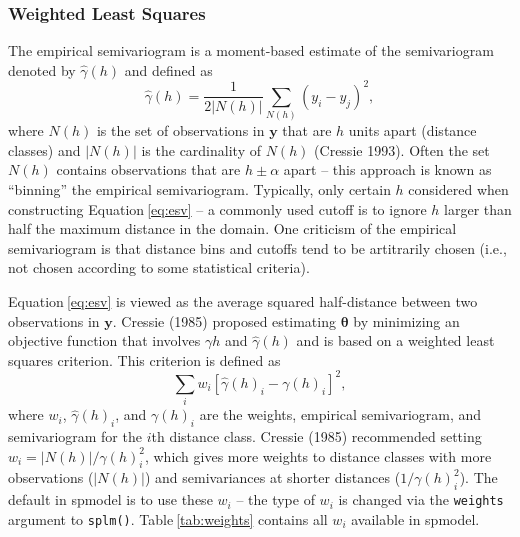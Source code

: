 \documentclass{article}
\begin{document}
\hypertarget{weighted-least-squares}{%
\subsubsection{Weighted Least Squares}\label{weighted-least-squares}}

The empirical semivariogram is a moment-based estimate of the
semivariogram denoted by \(\hat{\gamma}(h)\) and defined as
\begin{equation}\label{eq:esv}
  \hat{\gamma}(h) = \frac{1}{2|N(h)|} \sum_{N(h)} (y_i - y_j)^2, 
\end{equation} where \(N(h)\) is the set of observations in
\(\mathbf{y}\) that are \(h\) units apart (distance classes) and
\(|N(h)|\) is the cardinality of \(N(h)\) (Cressie 1993). Often the set
\(N(h)\) contains observations that are \(h \pm \alpha\) apart -- this
approach is known as ``binning'' the empirical semivariogram. Typically,
only certain \(h\) considered when constructing
Equation\(~\)\ref{eq:esv} -- a commonly used cutoff is to ignore \(h\)
larger than half the maximum distance in the domain. One criticism of
the empirical semivariogram is that distance bins and cutoffs tend to be
artitrarily chosen (i.e., not chosen according to some statistical
criteria).

Equation\(~\)\eqref{eq:esv} is viewed as the average squared
half-distance between two observations in \(\mathbf{y}\). Cressie (1985)
proposed estimating \(\bm{\theta}\) by minimizing an objective function
that involves \(\gamma{h}\) and \(\hat{\gamma}(h)\) and is based on a
weighted least squares criterion. This criterion is defined as
\begin{equation}\label{eq:svwls}
  \sum_i w_i [\hat{\gamma}(h)_i - \gamma(h)_i]^2,
\end{equation} where \(w_i\), \(\hat{\gamma}(h)_i\), and \(\gamma(h)_i\)
are the weights, empirical semivariogram, and semivariogram for the
\(i\)th distance class. Cressie (1985) recommended setting
\(w_i = |N(h)| / \gamma(h)_i^2\), which gives more weights to distance
classes with more observations (\(|N(h)|\)) and semivariances at shorter
distances (\(1 / \gamma(h)_i^2\)). The default in spmodel is to use
these \(w_i\) -- the type of \(w_i\) is changed via the \texttt{weights}
argument to \texttt{splm()}. Table\(~\)\ref{tab:weights} contains all
\(w_i\) available in spmodel.
\end{document}
